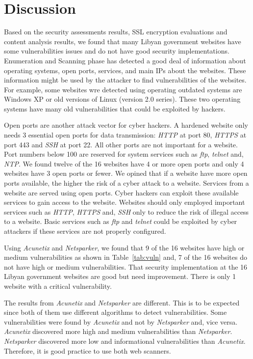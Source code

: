 \documentclass[conference,letterpaper]{IEEEtran}
\begin{document}
\section{Discussion}


Based on the security assessments results, SSL encryption
evaluations and content analysis results, we found that many
Libyan government websites have some vulnerabilities issues and
do not have good security implementations. Enumeration and Scanning
phase has detected a good deal of information about
operating systems, open ports, services, and main IPs about
the websites.  These information might be used by the
attacker to find vulnerabilities of the websites. For
example, some websites wre detected using operating outdated
systems are Windows XP or old versions of Linux (version 2.0
series). These two operating systems have many old
vulnerabilities that could be exploited by hackers.

Open ports are another attack vector for cyber hackers. A
hardened website only needs 3 essential open ports for data
transmission: \emph{HTTP} at port 80, \emph{HTTPS} at port
443 and \emph{SSH} at port 22. All other ports are not
important for a website. Port numbers below 100 are
reserved for system services such as \emph{ftp},
\emph{telnet} and, \emph{NTP}. We found twelve of the 16 websites
have 4 or more open ports and only 4 websites have 3 open
ports or fewer. We opined that if a website have more open ports available, the higher the risk of a cyber attack to a website.
Services from a website are served using open ports. Cyber
hackers can exploit these available services to gain access to the website. Websites should only employed important services
such as \emph{HTTP}, \emph{HTTPS} and, \emph{SSH} only to
reduce the risk of illegal access to a website. Basic services such as
\emph{ftp} and \emph{telnet} could be exploited by cyber
attackers if these services are not properly configured.

Using \emph{Acunetix} and \emph{Netsparker}, we found that 9
of the 16 websites have high or medium vulnerabilities as
shown in Table~\ref{tab:vuln} and, 7 of the 16 websites do
not have high or medium vulnerabilities. That security
implementation at the 16 Libyan government websites are
good but need improvement. There is only 1 website with a
critical vulnerability.

The results from \emph{Acunetix} and \emph{Netsparker} are
different. This is to be expected since both of them use
different algorithms to detect vulnerabilities. Some
vulnerabilities were found by \emph{Acunetix} and not by
\emph{Netsparker} and, vice versa. \emph{Acunetix}
discovered more high and medium vulnerabilities than
\emph{Netsparker}. \emph{Netsparker} discovered more low and
informational vulnerabilities than \emph{Acunetix}.
Therefore, it is good practice to use both web scanners.
\end{document}
